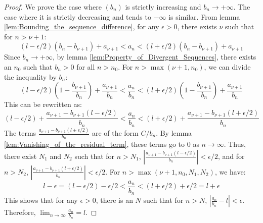\begin{proof}
    We prove the case where $(b_n)$ is strictly increasing and $b_n \to +\infty$. The case where it is strictly decreasing and tends to $-\infty$ is similar.
    From lemma \ref{lem:Bounding_the_sequence_difference}, for any $\epsilon > 0$, there exists $\nu$ such that for $n > \nu+1$:
    $$(l - \epsilon/2)(b_n - b_{\nu+1}) + a_{\nu+1} < a_n < (l + \epsilon/2)(b_n - b_{\nu+1}) + a_{\nu+1}$$
    Since $b_n \to +\infty$, by lemma \ref{lem:Property_of_Divergent_Sequences}, there exists an $n_0$ such that $b_n > 0$ for all $n > n_0$. For $n > \max(\nu+1, n_0)$, we can divide the inequality by $b_n$:
    $$(l - \epsilon/2)\left(1 - \frac{b_{\nu+1}}{b_n}\right) + \frac{a_{\nu+1}}{b_n} < \frac{a_n}{b_n} < (l + \epsilon/2)\left(1 - \frac{b_{\nu+1}}{b_n}\right) + \frac{a_{\nu+1}}{b_n}$$
    This can be rewritten as:
    $$(l - \epsilon/2) + \frac{a_{\nu+1} - b_{\nu+1}(l - \epsilon/2)}{b_n} < \frac{a_n}{b_n} < (l + \epsilon/2) + \frac{a_{\nu+1} - b_{\nu+1}(l + \epsilon/2)}{b_n}$$
    The terms $\frac{a_{\nu+1} - b_{\nu+1}(l \pm \epsilon/2)}{b_n}$ are of the form $C/b_n$. By lemma \ref{lem:Vanishing_of_the_residual_term}, these terms go to 0 as $n \to \infty$.
    Thus, there exist $N_1$ and $N_2$ such that for $n>N_1$, $\left|\frac{a_{\nu+1} - b_{\nu+1}(l - \epsilon/2)}{b_n}\right| < \epsilon/2$, and for $n>N_2$, $\left|\frac{a_{\nu+1} - b_{\nu+1}(l + \epsilon/2)}{b_n}\right| < \epsilon/2$.
    For $n > \max(\nu+1, n_0, N_1, N_2)$, we have:
    $$l - \epsilon = (l - \epsilon/2) - \epsilon/2 < \frac{a_n}{b_n} < (l + \epsilon/2) + \epsilon/2 = l + \epsilon$$
    This shows that for any $\epsilon > 0$, there is an $N$ such that for $n>N$, $|\frac{a_n}{b_n} - l| < \epsilon$. Therefore, $\lim_{n\to\infty} \frac{a_n}{b_n} = l$.
\end{proof}

